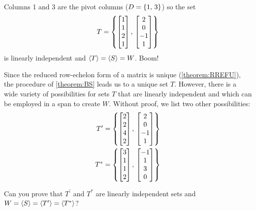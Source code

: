 \documentclass{ximera}
\begin{document}
\begin{example}
  Columns 1 and 3 are the pivot columns ($D=\left\{1,\,3\right\}$) so the set
  \[
    T=\left\{
      \begin{bmatrix} 1 \\ 1 \\ 2 \\ 1\end{bmatrix},\,
      \begin{bmatrix} 2 \\ 0 \\ -1 \\ 1\end{bmatrix}
    \right\}
  \]
  is linearly independent and $\left\langle T\right\rangle=\left\langle S\right\rangle=W$.  Boom!
  
  Since the reduced row-echelon form of a matrix is unique
  (\ref{theorem:RREFU}), the procedure of \ref{theorem:BS} leads us to
  a unique set $T$.  However, there is a wide variety of possibilities
  for sets $T$ that are linearly independent and which can be employed
  in a span to create $W$.  Without proof, we list two other
  possibilities:
  \begin{align*}
    T^{\prime}&=\left\{
                \begin{bmatrix} 2 \\ 2 \\ 4 \\ 2\end{bmatrix},\,
    \begin{bmatrix} 2 \\ 0 \\ -1 \\ 1\end{bmatrix}
    \right\}\\
    T^{*}&=\left\{
           \begin{bmatrix}3 \\ 1 \\ 1 \\ 2\end{bmatrix},\,
    \begin{bmatrix}-1 \\ 1 \\ 3 \\ 0\end{bmatrix}
    \right\}
  \end{align*}

  Can you prove that $T^{\prime}$ and $T^{*}$ are linearly independent
  sets and $W=\left\langle S\right\rangle=\left\langle T^{\prime}\right\rangle=\left\langle T^{*}\right\rangle$?
\end{example}
\end{document}
